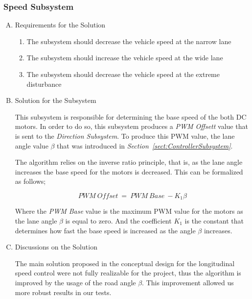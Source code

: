 \documentclass[a4paper,12pt]{article}
\begin{document}
\subsubsection{Speed Subsystem}


\begin{enumerate}[A.]

\item {Requirements for the Solution}


\begin{enumerate}[1)]

\item The subsystem should decrease the vehicle speed at the narrow lane 

\item The subsystem should increase the vehicle speed at the wide lane

\item The subsystem should decrease the vehicle speed at the extreme disturbance  

\end{enumerate}


\item {Solution for the Subsystem}


This subsystem is responsible for determining the base speed of the both DC motors. In order to do so, this subsystem produces a \textit{PWM Offsett} value that is sent to the \textit{Direction Subsystem}. To produce this PWM value, the lane angle value $\beta$ that was introduced in \textit{Section~\ref{sect:ControllerSubsystem}}.


The algorithm relies on the inverse ratio principle, that is, as the lane angle increases the base speed for the motors is decreased. This can be formalized as follows;


$$ PWM~Offset~=~PWM~Base~-K_1 \beta$$


Where the \textit{PWM Base} value is the maximum PWM value for the motors as the lane angle $\beta$ is equal to zero. And the coefficient $K_1$ is the constant that determines how fast the base speed is increased as the angle $\beta$ increases.



\item {Discussions on the Solution}


The main solution proposed in the conceptual design for the longitudinal speed control were not fully realizable for the project, thus the algorithm is improved by the usage of the road angle $\beta$. This improvement allowed us more robust results in our tests.


\end{enumerate}
\end{document}
